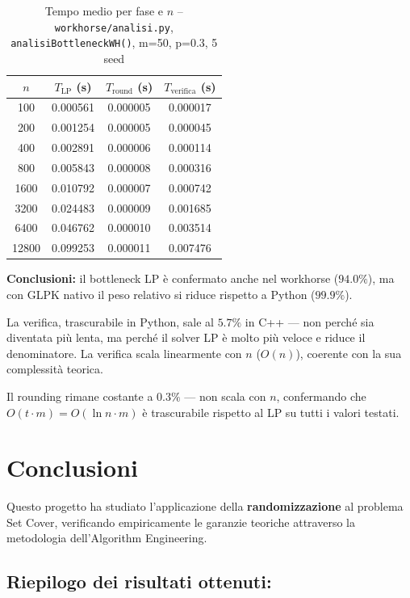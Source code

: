 \documentclass[12pt, a4paper]{article}
\begin{document}
\begin{table}[H]
\centering
\caption{Tempo medio per fase e $n$ -- 
\texttt{workhorse/analisi.py}, \texttt{analisiBottleneckWH()}, m=50, p=0.3, 5 seed}
\label{tab:wh_bottleneck_n}
\begin{tabular}{cccc}
\toprule
$n$ & $T_{\mathrm{LP}}$ (s) & $T_{\mathrm{round}}$ (s) & $T_{\mathrm{verifica}}$ (s) \\
\midrule
100   & 0.000561 & 0.000005 & 0.000017 \\
200   & 0.001254 & 0.000005 & 0.000045 \\
400   & 0.002891 & 0.000006 & 0.000114 \\
800   & 0.005843 & 0.000008 & 0.000316 \\
1600  & 0.010792 & 0.000007 & 0.000742 \\
3200  & 0.024483 & 0.000009 & 0.001685 \\
6400  & 0.046762 & 0.000010 & 0.003514 \\
12800 & 0.099253 & 0.000011 & 0.007476 \\
\bottomrule
\end{tabular}
\end{table}

\textbf{Conclusioni:} il bottleneck LP \`e confermato anche nel workhorse 
($94.0\%$), ma con GLPK nativo il peso relativo si riduce rispetto 
a Python ($99.9\%$). 

La verifica, trascurabile in Python, sale al $5.7\%$ in C++ — 
non perch\'e sia diventata pi\`u lenta, ma perch\'e il solver LP 
\`e molto pi\`u veloce e riduce il denominatore. 
La verifica scala linearmente con $n$ ($O(n)$), 
coerente con la sua complessit\`a teorica.

Il rounding rimane costante a $0.3\%$ — non scala con $n$, 
confermando che $O(t \cdot m) = O(\ln n \cdot m)$ \`e trascurabile 
rispetto al LP su tutti i valori testati.

\section{Conclusioni}

Questo progetto ha studiato l'applicazione della \textbf{randomizzazione} 
al problema Set Cover, verificando empiricamente le garanzie teoriche 
attraverso la metodologia dell'Algorithm Engineering.

\subsection*{Riepilogo dei risultati ottenuti:}
\end{document}
